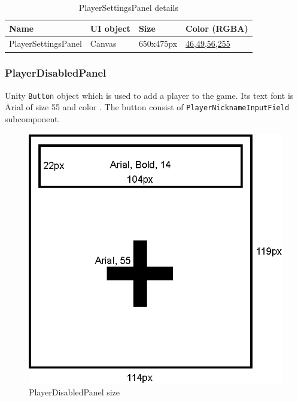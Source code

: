 \begin{table}[h!]\centering
	\caption{PlayerSettingsPanel details}
	\begin{tabular}{|C{4cm}|C{4cm}|C{4cm}|C{4cm}|}
		\hline
		\textbf{Name} & \textbf{UI object} & \textbf{Size} & \textbf{Color (RGBA)} \\\hline
		PlayerSettingsPanel & Canvas & 650x475px & \hyperref[gui-colors]{46,49,56,255} \\\hline
	\end{tabular}
\end{table}

\subsubsection{PlayerDisabledPanel}\label{gui-playerdisabledpanel}
\noindent Unity \verb|Button| object which is used to add a player to the game. Its text font is Arial of size 55 and color . The button consist of \verb|PlayerNicknameInputField| subcomponent.

\vspace*{-.25cm}
\begin{figure}[h!]\centering
	\hspace*{.75cm}\includegraphics[scale=1]{gui-imgs/playerdisabledpanel-size}
	\caption{PlayerDisabledPanel size}
\end{figure}

